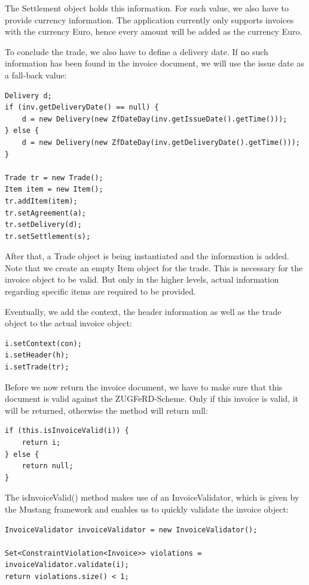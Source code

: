 The Settlement object holds this information. For each value, we also have to provide currency information. The application currently only supports invoices with the currency Euro, hence every amount will be added as the currency Euro.

To conclude the trade, we also have to define a delivery date. If no such information has been found in the invoice document, we will use the issue date as a fall-back value:

\begin{lstlisting}[caption={Population of the trade object}]
Delivery d;
if (inv.getDeliveryDate() == null) {
    d = new Delivery(new ZfDateDay(inv.getIssueDate().getTime()));
} else {
    d = new Delivery(new ZfDateDay(inv.getDeliveryDate().getTime()));
}

Trade tr = new Trade();
Item item = new Item();
tr.addItem(item);
tr.setAgreement(a);
tr.setDelivery(d);
tr.setSettlement(s);
\end{lstlisting}

After that, a Trade object is being instantiated and the information is added. Note that we create an empty Item object for the trade. This is necessary for the invoice object to be valid. But only in the higher levels, actual information regarding specific items are required to be provided.

Eventually, we add the context, the header information as well as the trade object to the actual invoice object:

\begin{lstlisting}[caption={Population of the invoice object}]
i.setContext(con);
i.setHeader(h);
i.setTrade(tr);
\end{lstlisting}

Before we now return the invoice document, we have to make sure that this document is valid against the ZUGFeRD-Scheme. Only if this invoice is valid, it will be returned, otherwise the method will return null:

\begin{lstlisting}[caption={Validation of the invoice object}]
if (this.isInvoiceValid(i)) {
    return i;
} else {
    return null;
}
\end{lstlisting}

The isInvoiceValid() method makes use of an InvoiceValidator, which is given by the Mustang framework and enables us to quickly validate the invoice object:

\begin{lstlisting}[caption={Usage of the InvoiceValidator object}]
InvoiceValidator invoiceValidator = new InvoiceValidator();

Set<ConstraintViolation<Invoice>> violations = invoiceValidator.validate(i);
return violations.size() < 1;
\end{lstlisting}

